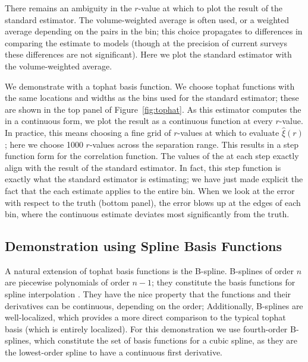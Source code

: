 There remains an ambiguity in the $r$-value at which to plot the result of the standard estimator. 
The volume-weighted average is often used, or a weighted average depending on the pairs in the bin; this choice propagates to differences in comparing the estimate to models (though at the precision of current surveys these differences are not significant).
Here we plot the standard estimator with the volume-weighted average.

We demonstrate \est with a tophat basis function.
We choose tophat functions with the same locations and widths as the bins used for the standard estimator; these are shown in the top panel of Figure~\ref{fig:tophat}. 
As this estimator computes the \cf in a continuous form, we plot the result as a continuous function at every $r$-value.
In practice, this means choosing a fine grid of $r$-values at which to evaluate $\hat{\xi}(r)$; here we choose 1000 $r$-values across the separation range.
This results in a step function form for the correlation function.
The values of the \cf at each step exactly align with the result of the standard estimator.
In fact, this step function is exactly what the standard estimator is estimating; we have just made explicit the fact that the each estimate applies to the entire bin.
When we look at the error with respect to the truth (bottom panel), the error blows up at the edges of each bin, where the continuous estimate deviates most significantly from the truth.

\subsection{Demonstration using Spline Basis Functions}
\label{sec:spline}

A natural extension of tophat basis functions is the B-spline.
B-splines of order $n$ are piecewise polynomials of order $n-1$; they constitute the basis functions for spline interpolation \citep{deBoor1987}.
They have the nice property that the functions and their derivatives can be continuous, depending on the order; 
Additionally, B-splines are well-localized, which provides a more direct comparison to the typical tophat basis (which is entirely localized).
For this demonstration we use fourth-order B-splines, which constitute the set of basis functions for a cubic spline, as they are the lowest-order spline to have a continuous first derivative.

